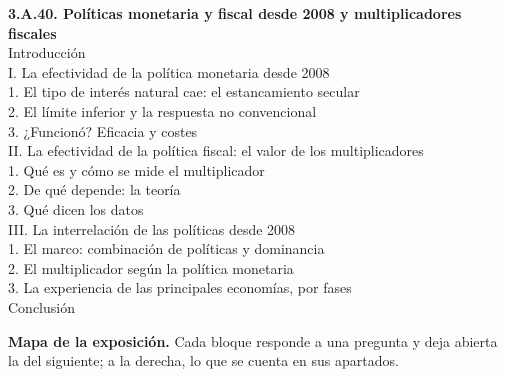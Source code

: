\documentclass[11pt]{article}
\begin{document}
\begin{esquema}[unbreakable]
\textbf{3.A.40. Políticas monetaria y fiscal desde 2008 y multiplicadores fiscales}\\[2pt]
Introducción\\
I. La efectividad de la política monetaria desde 2008\\
\hspace*{1.5em}1. El tipo de interés natural cae: el estancamiento secular\\
\hspace*{1.5em}2. El límite inferior y la respuesta no convencional\\
\hspace*{1.5em}3. ¿Funcionó? Eficacia y costes\\
II. La efectividad de la política fiscal: el valor de los multiplicadores\\
\hspace*{1.5em}1. Qué es y cómo se mide el multiplicador\\
\hspace*{1.5em}2. De qué depende: la teoría\\
\hspace*{1.5em}3. Qué dicen los datos\\
III. La interrelación de las políticas desde 2008\\
\hspace*{1.5em}1. El marco: combinación de políticas y dominancia\\
\hspace*{1.5em}2. El multiplicador según la política monetaria\\
\hspace*{1.5em}3. La experiencia de las principales economías, por fases\\
Conclusión
\end{esquema}

\begin{anotaciones}
\textbf{Mapa de la exposición.} Cada bloque responde a una pregunta y deja abierta la del siguiente; a la derecha, lo que se cuenta en sus apartados.
\begin{infografiacaja}
\caption{Mapa de la exposición: la pregunta de cada bloque y el hilo que los une}\label{figu:mapa-tema}
\end{infografiacaja}
\end{anotaciones}
\end{document}
